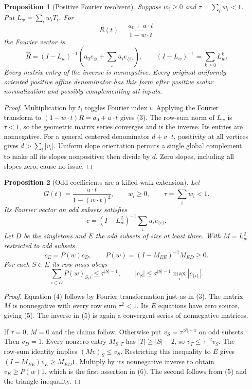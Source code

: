 \documentclass[11pt]{article}
\newtheorem{proposition}{Proposition}
\begin{document}
\begin{proposition}[Positive Fourier resolvent]
Suppose $w_i\geq0$ and $\tau=\sum_iw_i<1$. Put
$L_w=\sum_iw_iT_i$. For
\[
 R(t)=\frac{a_0+a\cdot t}{1-w\cdot t}
\]
the Fourier vector is
\[
 \widehat R=(I-L_w)^{-1}
           \left(a_0e_\varnothing+\sum_i a_ie_{\{i\}}\right),
 \qquad (I-L_w)^{-1}=\sum_{k\geq0}L_w^k.                   \tag{3}
\]
Every matrix entry of the inverse is nonnegative. Every original
uniformly oriented positive affine denominator has this form after
positive scalar normalization and possibly complementing all inputs.
\end{proposition}
\begin{proof}
Multiplication by $t_i$ toggles Fourier index $i$. Applying the
Fourier transform to $(1-w\cdot t)R=a_0+a\cdot t$ gives (3).
The row-sum norm of $L_w$ is $\tau<1$, so the geometric matrix series
converges and is the inverse. Its entries are nonnegative.
For a general centered denominator $d+v\cdot t$, positivity at all
vertices gives $d>\sum_i|v_i|$. Uniform slope orientation permits a
single global complement to make all its slopes nonpositive; then
divide by $d$. Zero slopes, including all slopes zero, cause no issue.
\end{proof}

\begin{proposition}[Odd coefficients are a killed-walk extension]
Let
\[
 G(t)=\frac{u\cdot t}{1-(w\cdot t)^2},\qquad
 w_i\geq0,\qquad \tau=\sum_iw_i<1.
\]
Its Fourier vector on odd subsets satisfies
\[
 c=(I-L_w^2)^{-1}\sum_i u_ie_{\{i\}}.                      \tag{4}
\]
Let $D$ be the singletons and $E$ the odd subsets of size at least
three. With $M=L_w^2$ restricted to odd subsets,
\[
 c_E=P(w)c_D,\qquad
 P(w)=(I-M_{EE})^{-1}M_{ED}\geq0.                          \tag{5}
\]
For each $S\in E$ its row mass obeys
\[
 \sum_{i\in D}P(w)_{S,i}\leq\tau^{|S|-1},\qquad
 |c_S|\leq\tau^{|S|-1}\max_i|c_{\{i\}}|.                 \tag{6}
\]
\end{proposition}
\begin{proof}
Equation (4) follows by Fourier transformation just as in (3).
The matrix $M$ is nonnegative with every row sum $\tau^2<1$.
Its $E$ equations have zero source, giving (5). The inverse in (5)
is again a convergent series of nonnegative matrices.

If $\tau=0$, $M=0$ and the claims follow. Otherwise put
$v_S=\tau^{|S|-1}$ on odd subsets. Then $v_D=1$.
Every nonzero entry $M_{S,T}$ has $|T|\geq|S|-2$, so
$v_T\leq\tau^{-2}v_S$. The row-sum identity implies
$(Mv)_S\leq v_S$. Restricting this inequality to $E$ gives
$(I-M_{EE})v_E\geq M_{ED}1$. Multiply by its nonnegative inverse
to obtain $v_E\geq P(w)1$, which is the first assertion in (6).
The second follows from (5) and the triangle inequality.
\end{proof}
\end{document}
